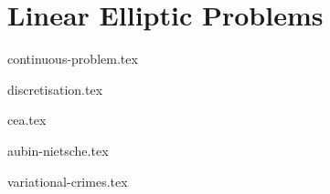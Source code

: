 
\section{Linear Elliptic Problems}

{continuous-problem.tex}

{discretisation.tex}

{cea.tex}

{aubin-nietsche.tex}

{variational-crimes.tex}

